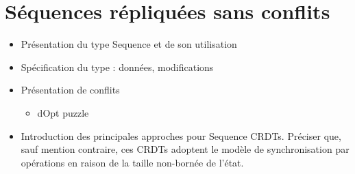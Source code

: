 \section{Séquences répliquées sans conflits}

\begin{itemize}
  \item Présentation du type Sequence et de son utilisation
  \item Spécification du type : données, modifications
  \item Présentation de conflits
  \begin{itemize}
    \item dOpt puzzle
  \end{itemize}
  \item Introduction des principales approches pour Sequence \acp{CRDT}.
    Préciser que, sauf mention contraire, ces \acp{CRDT} adoptent le modèle de synchronisation par opérations en raison de la taille non-bornée de l'état.
\end{itemize}
